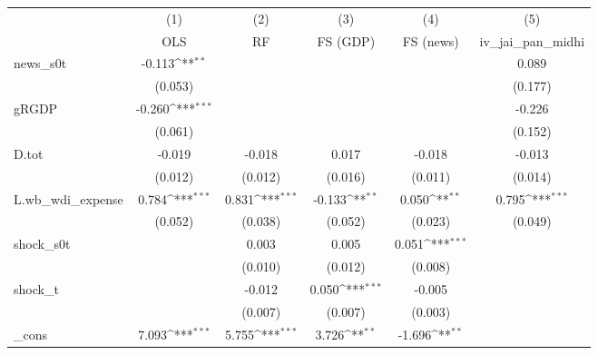 {
\def\sym#1{\ifmmode^{#1}\else\(^{#1}\)\fi}
\begin{tabular}{l*{5}{c}}
\toprule
            &\multicolumn{1}{c}{(1)}&\multicolumn{1}{c}{(2)}&\multicolumn{1}{c}{(3)}&\multicolumn{1}{c}{(4)}&\multicolumn{1}{c}{(5)}\\
            &\multicolumn{1}{c}{OLS}&\multicolumn{1}{c}{RF}&\multicolumn{1}{c}{FS (GDP)}&\multicolumn{1}{c}{FS (news)}&\multicolumn{1}{c}{iv\_jai\_pan\_midhi}\\
\midrule
news\_s0t    &      -0.113\sym{**} &                     &                     &                     &       0.089         \\
            &     (0.053)         &                     &                     &                     &     (0.177)         \\
\addlinespace
gRGDP       &      -0.260\sym{***}&                     &                     &                     &      -0.226         \\
            &     (0.061)         &                     &                     &                     &     (0.152)         \\
\addlinespace
D.tot       &      -0.019         &      -0.018         &       0.017         &      -0.018         &      -0.013         \\
            &     (0.012)         &     (0.012)         &     (0.016)         &     (0.011)         &     (0.014)         \\
\addlinespace
L.wb\_wdi\_expense&       0.784\sym{***}&       0.831\sym{***}&      -0.133\sym{**} &       0.050\sym{**} &       0.795\sym{***}\\
            &     (0.052)         &     (0.038)         &     (0.052)         &     (0.023)         &     (0.049)         \\
\addlinespace
shock\_s0t   &                     &       0.003         &       0.005         &       0.051\sym{***}&                     \\
            &                     &     (0.010)         &     (0.012)         &     (0.008)         &                     \\
\addlinespace
shock\_t     &                     &      -0.012         &       0.050\sym{***}&      -0.005         &                     \\
            &                     &     (0.007)         &     (0.007)         &     (0.003)         &                     \\
\addlinespace
\_cons      &       7.093\sym{***}&       5.755\sym{***}&       3.726\sym{**} &      -1.696\sym{**} &                     \\

\end{tabular}}
